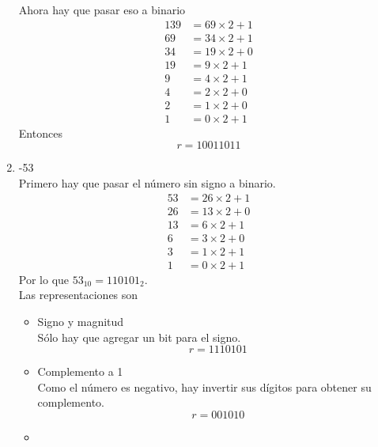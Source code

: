 \documentclass{article}
\begin{document}
\begin{enumerate}
{\begin{itemize}
{                    Ahora hay que pasar eso a binario
                    \begin{align*}
                        139 &= 69 \times 2 + 1 \\
                        69 &= 34 \times 2 + 1 \\
                        34 &= 19 \times 2 + 0 \\
                        19 &= 9 \times 2 + 1 \\
                        9 &= 4 \times 2 + 1 \\
                        4 &= 2 \times 2 + 0 \\
                        2 &= 1 \times 2 + 0 \\
                        1 &= 0 \times 2 + 1
                    \end{align*}
                    Entonces
                    \[r = 10011011\]
                    }
            \end{itemize}
        }
        \item {
            -53 \\
            Primero hay que pasar el número sin signo a binario.
            \begin{align*}
                53 &= 26 \times 2 + 1 \\
                26 &= 13 \times 2 + 0 \\
                13 &= 6 \times 2 + 1 \\
                6 &= 3 \times 2 + 0 \\
                3 &= 1 \times 2 + 1 \\
                1 &= 0 \times 2 + 1
            \end{align*}
            Por lo que $53_{10} = 110101_{2}$. \\
            Las representaciones son 
            \begin{itemize}
                \item {
                    Signo y magnitud \\
                    Sólo hay que agregar un bit para el signo.
                    \[r = 1110101\]
                }
                \item {
                    Complemento a 1\\
                    Como el número es negativo, hay invertir sus dígitos para 
                    obtener su complemento.
                    \[r = 001010\]
                }
                \item {
}
\end{itemize}}
\end{enumerate}
\end{document}
